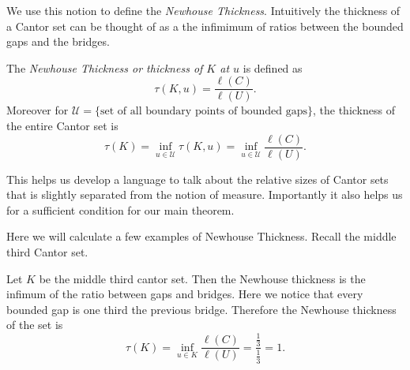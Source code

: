 We use this notion to define the \textit{Newhouse Thickness}.  Intuitively the thickness of a Cantor set can be thought of as a the infimimum of ratios between the bounded gaps and the bridges.  
\begin{definition}
    The \textit{Newhouse Thickness or thickness of $K$ at $u$} is defined as
    $$\tau(K, u) = \frac{\ell(C)}{\ell(U)}.$$
    Moreover for $\mathcal{U} = \{ \text{set of all boundary points of bounded gaps}\}$, the thickness of the entire Cantor set is 
    $$\tau(K) = \inf_{u\in \mathcal{U}} \tau(K, u) = \inf_{u\in \mathcal{U}}\frac{\ell(C)}{\ell(U)}.$$
\end{definition}
This helps us develop a language to talk about the relative sizes of Cantor sets that is slightly separated from the notion of measure.  Importantly it also helps us for a sufficient condition for our main theorem.

Here we will calculate a few examples of Newhouse Thickness.  Recall the middle third Cantor set.  
\begin{example}
    Let $K$ be the middle third cantor set.  Then the Newhouse thickness is the infimum of the ratio between gaps and bridges.  Here we notice that every bounded gap is one third the previous bridge.  Therefore the Newhouse thickness of the set is 
    $$\tau(K) = \inf_{u\in K}\frac{\ell(C)}{\ell(U)} = \frac{\frac{1}{3}}{\frac{1}{3}} = 1.$$
\end{example}

